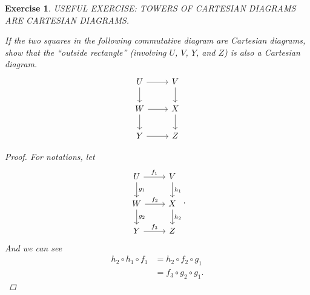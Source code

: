 \documentclass{article}
\theoremstyle{breakstyle}
\newtheorem{exercise}{Exercise}[section]
\begin{document}
\begin{exercise}
USEFUL EXERCISE: TOWERS OF CARTESIAN DIAGRAMS ARE CARTESIAN DIAGRAMS.

If the two squares in the following commutative diagram are Cartesian
diagrams, show that the ``outside rectangle'' (involving $U$, $V$, $Y$, and
$Z$) is also a Cartesian diagram.
$$
\begin{tikzcd}
    U \arrow[r] \arrow[d] & V \arrow[d] \\
    W \arrow[r] \arrow[d] & X \arrow[d] \\
    Y \arrow[r] & Z
\end{tikzcd}
$$

\begin{proof}
	For notations, let
	$$
	\begin{tikzcd}
        U \arrow[r, "f_1"] \arrow[d, "g_1"] & V \arrow[d, "h_1"] \\
        W \arrow[d, "g_2"] \arrow[r, "f_2"] & X \arrow[d, "h_2"] \\
        Y \arrow[r, "f_3"]                  & Z                 
    \end{tikzcd}
	.$$ 
	And we can see
	\begin{align*}
		h_2\circ h_1\circ f_1
        &=h_2\circ f_2\circ g_1\\
		&=f_3\circ g_2\circ g_1
	.\end{align*}
\end{proof}

\end{exercise}
\end{document}
